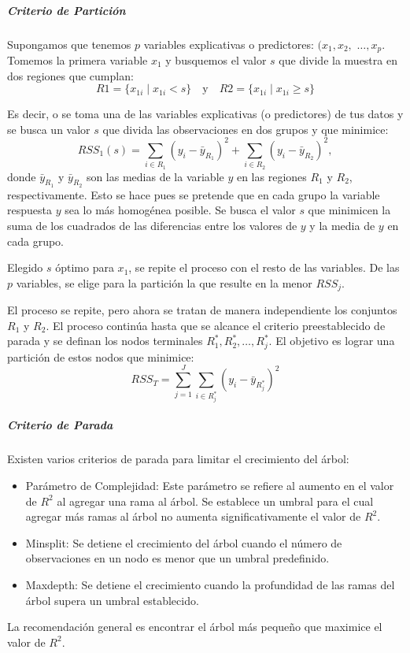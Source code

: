 \subparagraph{Criterio de Partición}
Supongamos que tenemos \(p\) variables explicativas o predictores: $(x_1, x_2,$ $\ldots, x_p$. Tomemos la primera variable \(x_1\) y busquemos el valor \(s\) que divide la muestra en dos regiones que cumplan:
\[
R1 = \{x_{1i} \mid x_{1i} < s\} \quad \text{y} \quad R2 = \{x_{1i} \mid x_{1i} \geq s\}
\]

Es decir, o se toma una de las variables explicativas (o predictores) de tus datos y se busca un valor $s$ que divida las observaciones en dos grupos y que minimice:
\[
RSS_1(s) = \sum_{i \in R_1} (y_i - \bar{y}_{R_1})^2 + \sum_{i \in R_2} (y_i - \bar{y}_{R_2})^2,
\]
donde \(\bar{y}_{R_1}\) y \(\bar{y}_{R_2}\) son las medias de la variable \(y\) en las regiones \(R_1\) y \(R_2\), respectivamente. Esto se hace pues se pretende que en cada grupo la variable respuesta \(y\) sea lo más homogénea posible. Se busca el valor $s$ que minimicen la suma de los cuadrados de las diferencias entre los valores de $y$ y la media de $y$ en cada grupo.

Elegido \(s\) óptimo para \(x_1\), se repite el proceso con el resto de las variables. De las \(p\) variables, se elige para la partición la que resulte en la menor \(RSS_j\).

El proceso se repite, pero ahora se tratan de manera independiente los conjuntos \(R_1\) y \(R_2\). El proceso continúa hasta que se alcance el criterio preestablecido de parada y se definan los nodos terminales \(R_1^*, R_2^*, \ldots, R_j^*\). El objetivo es lograr una partición de estos nodos que minimice:
\[
RSS_T = \sum_{j=1}^{J} \sum_{i \in R_j^*} (y_i - \bar{y}_{R_j^*})^2
\]

\subparagraph{Criterio de Parada}
Existen varios criterios de parada para limitar el crecimiento del árbol:
\begin{itemize}
	\item Parámetro de Complejidad: Este parámetro se refiere al aumento en el valor de \(R^2\) al agregar una rama al árbol. Se establece un umbral para el cual agregar más ramas al árbol no aumenta significativamente el valor de \(R^2\).
	\item Minsplit: Se detiene el crecimiento del árbol cuando el número de observaciones en un nodo es menor que un umbral predefinido.
	\item Maxdepth: Se detiene el crecimiento cuando la profundidad de las ramas del árbol supera un umbral establecido.
\end{itemize}
La recomendación general es encontrar el árbol más pequeño que maximice el valor de \(R^2\).

